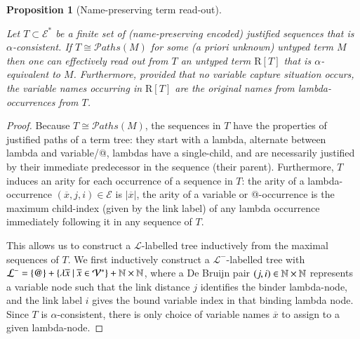 \documentclass{elsarticle}
\theoremstyle{plain}
\newtheorem{proposition}[theorem]{Proposition}
\theoremstyle{definition}
\def\structisomorphic{\cong} %
\def\readout{\mathrm{R}} %
\def\nameencoding{\mathcal{E}} %
\newcommand\pathset{{\mathcal{P}aths}} %
\begin{document}
\begin{proposition}[Name-preserving term read-out]
\label{proposition:termtree_readout_from_justitied_paths}

Let $T\subset \nameencoding^*$ be a finite set of (name-preserving encoded) justified sequences  that is $\alpha$-consistent.
If $T\structisomorphic \pathset(M)$ for some (a priori unknown) untyped term $M$ then one can effectively read out from $T$ an untyped
term  $\readout[T]$ that is $\alpha$-equivalent to $M$.
%
Furthermore, provided that no variable capture situation occurs, the variable names occurring in $\readout[T]$ are the original names from lambda-occurrences from $T$.
\end{proposition}
\begin{proof}
    Because $T \structisomorphic \pathset(M)$, the sequences in $T$ have the properties
of justified paths of a term tree: they start with a lambda, alternate between lambda and variable/@, lambdas have
a single-child, and are necessarily justified by their immediate predecessor in the sequence (their parent).
Furthermore, $T$ induces an arity for each occurrence of a sequence in $T$: the arity of a lambda-occurrence $(\overline{x},j,i)\in\nameencoding$ is $|\overline{x}|$, the arity of a variable or @-occurrence is the maximum
child-index (given by the link label) of any lambda occurrence immediately following it in any sequence of $T$.

This allows us to construct a $\mathcal{L}$-labelled tree
inductively from the maximal sequences of $T$.
We first inductively construct a $\mathcal{L^-}$-labelled tree with
$\mathcal{L^-} = \{ @ \} + \{
    \lambda \overline{x} \ | \
    \overline{x} \in \mathcal{V}^* \} + \mathbb{N}\times\mathbb{N}$,
where a De Bruijn pair $(j,i)\in \mathbb{N}\times\mathbb{N}$ represents a variable node such that the link distance $j$ identifies the binder lambda-node, and the link label $i$ gives the bound variable index in that binding lambda node. Since $T$ is $\alpha$-consistent, there is only choice of variable names $\overline{x}$ to assign to a given lambda-node.


\end{proof}
\end{document}
